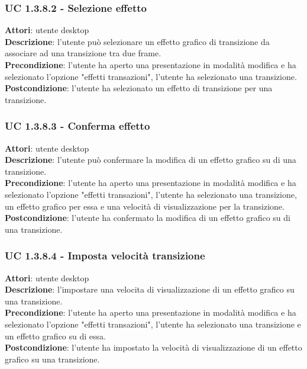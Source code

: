 \subsubsection{UC 1.3.8.2 - Selezione effetto}{
	\label{uc1.3.8.2}
	\textbf{Attori}: utente desktop \\
	\textbf{Descrizione}: l'utente può selezionare un effetto grafico di transizione da associare ad una transizione tra due frame. \\
	\textbf{Precondizione}: l'utente ha aperto una presentazione in modalità modifica e ha selezionato l'opzione "effetti transazioni", l'utente ha selezionato una transizione.	\\
	\textbf{Postcondizione}: l'utente ha selezionato un effetto di transizione per una transizione.	
}
\subsubsection{UC 1.3.8.3 - Conferma effetto}{
	\label{uc1.3.8.3}
	\textbf{Attori}: utente desktop \\
	\textbf{Descrizione}: l'utente può confermare la modifica di un effetto grafico su di una transizione. \\
	\textbf{Precondizione}: l'utente ha aperto una presentazione in modalità modifica e ha selezionato l'opzione "effetti transazioni", l'utente ha selezionato una transizione, un effetto grafico per essa e una velocità di visualizzazione per la transizione.	\\
	\textbf{Postcondizione}: l'utente ha confermato la modifica di un effetto grafico su di una transizione.
}
\subsubsection{UC 1.3.8.4 - Imposta velocità transizione}{
	\label{uc1.3..8.4}
	\textbf{Attori}: utente desktop \\
	\textbf{Descrizione}: l'impostare una velocita di visualizzazione di un effetto grafico su una transizione. \\
	\textbf{Precondizione}: l'utente ha aperto una presentazione in modalità modifica e ha selezionato l'opzione "effetti transazioni", l'utente ha selezionato una transizione e un effetto grafico su di essa.	\\
	\textbf{Postcondizione}: l'utente ha impostato la velocità di visualizzazione di un effetto grafico su una transizione.
}
